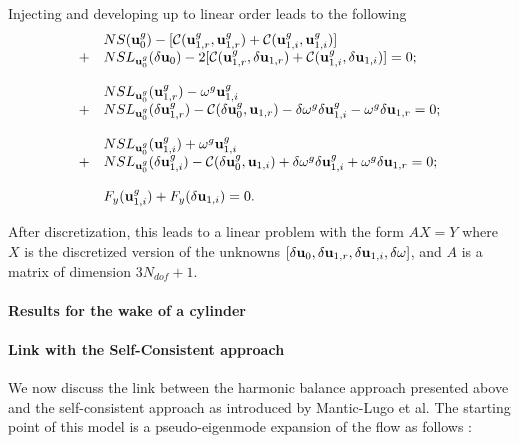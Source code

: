\documentclass[twocolumn,10pt]{asme2ej}
\begin{document}
Injecting and developing up to linear order leads to the following 
\begin{equation}
\begin{array}{ll}
\displaystyle
& NS(  {\bf u }_0^g ) - [ {\cal C}( {\bf u }_{1,r}^g,{\bf u }_{1,r}^g) +  {\cal C}( {\bf u }_{1,i}^g,{\bf u }_{1,i}^g) ]
\\
+& NSL_{{\bf u }_0^g}(\delta {\bf u }_0) - 2 [ {\cal C}( {\bf u }_{1,r}^g,\delta {\bf u }_{1,r}) +  {\cal C}( {\bf u }_{1,i}^g,\delta {\bf u }_{1,i}) ] = 0;
\\
\\
&  NSL_{{\bf u }_0^g}( {\bf u }_{1,r}^g) - \omega^g {\bf u }_{1,i}^g 
 \\
  +& NSL_{{\bf u }_0^g}( \delta {\bf u }_{1,r}^g) 
   -  {\cal C}( \delta {\bf u }_{0}^g, {\bf u }_{1,r})
   - \delta \omega^g \delta {\bf u }_{1,i}^g 
 - \omega^g \delta {\bf u }_{1,r} = 0 ;
 \\
\\
&  NSL_{{\bf u }_0^g}({\bf u }_{1,i}^g) + \omega^g {\bf u }_{1,i}^g
 \\
  +& NSL_{{\bf u }_0^g}( \delta {\bf u }_{1,i}^g) 
  -  {\cal C}( \delta {\bf u }_{0}^g, {\bf u }_{1,i}) 
  + \delta \omega^g \delta {\bf u }_{1,i}^g 
+ \omega^g \delta {\bf u }_{1,r} = 0 ;
\\
\\
& F_y({\bf u }_{1,i}^g) + F_y(\delta {\bf u }_{1,i}) = 0.
 \end{array}
\end{equation}

After discretization, this leads to a linear problem with the form $A X = Y$ where $X$ is the discretized version of the unknowns  $[\delta {\bf u }_0, \delta {\bf u }_{1,r}, \delta {\bf u }_{1,i}, \delta \omega]$, and $A$ is a matrix of dimension $3 N_{dof} +1$. 
 


\paragraph{Results for the wake of a cylinder}


\paragraph{Link with the Self-Consistent approach}

We now discuss the link between the harmonic balance approach presented above and the self-consistent approach as introduced by Mantic-Lugo et al.
The starting point of this model is a pseudo-eigenmode expansion of the flow as follows :
\end{document}
